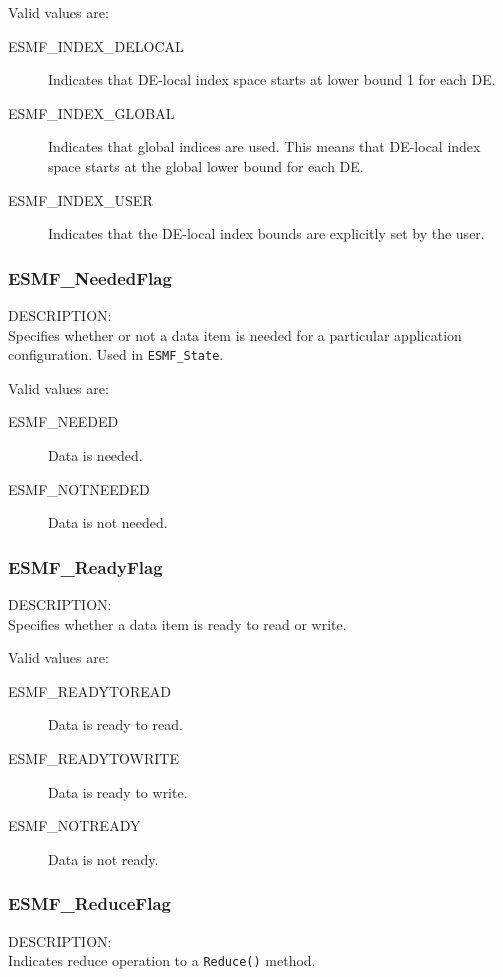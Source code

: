 Valid values are:
\begin{description}
\item [ESMF\_INDEX\_DELOCAL]
      Indicates that DE-local index space starts at lower bound 1 for each DE.
\item [ESMF\_INDEX\_GLOBAL]
      Indicates that global indices are used. This means that DE-local index
      space starts at the global lower bound for each DE.
\item [ESMF\_INDEX\_USER]
      Indicates that the DE-local index bounds are explicitly set by the user.
      
\end{description}

\subsubsection{ESMF\_NeededFlag}
\label{opt:neededflag}
{\sf DESCRIPTION:\\}
Specifies whether or not a data item is needed for a 
particular application configuration.  Used in {\tt ESMF\_State}.

Valid values are:
\begin{description}
   \item [ESMF\_NEEDED] 
         Data is needed.
   \item [ESMF\_NOTNEEDED]
         Data is not needed.
\end{description}

\subsubsection{ESMF\_ReadyFlag}
\label{opt:readyflag}
{\sf DESCRIPTION:\\}
Specifies whether a data item is ready to read or write.

Valid values are:
\begin{description}
   \item [ESMF\_READYTOREAD] 
         Data is ready to read.
   \item [ESMF\_READYTOWRITE]
         Data is ready to write.
   \item [ESMF\_NOTREADY]
         Data is not ready.
\end{description}

\subsubsection{ESMF\_ReduceFlag}
\label{opt:reduceflag}
{\sf DESCRIPTION:\\}
Indicates reduce operation to a {\tt Reduce()} method.

